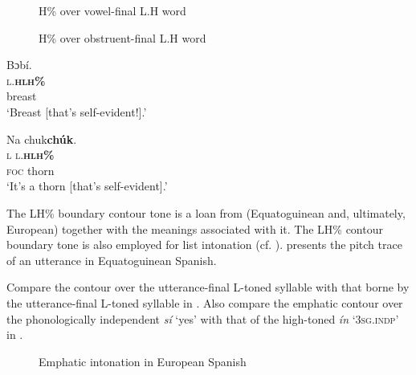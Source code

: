 \begin{figure}
\caption{H\% over vowel-final L.H word}
\label{fig:key:3.33}
\end{figure}


\begin{figure}
\caption{H\% over obstruent-final L.H word}
\label{fig:key:3.34}
\end{figure}

\clearpage 
\ea%
    \label{ex:key:86}
    \glll   Bɔbí.\\
\textsc{l.}\textbf{\textsc{h}}\textbf{\textsc{lh\%}}\\
breast\\
\glt ‘Breast [that’s self-evident!].’ 
\z

\ea
\label{ex:key:87}
\glll Na  chuk\textbf{chúk}.\\
\textsc{l}  \textsc{l.}\textbf{\textsc{hlh\%}}\\
\textsc{foc}  thorn\\
\glt ‘It’s a thorn [that’s self-evident].’
\z

The LH\% boundary contour tone is a loan from (Equatoguinean and, ultimately, European)  together with the meanings associated with it. The LH\% contour boundary tone is also employed for list intonation (cf. ).  presents the pitch trace of an utterance in Equatoguinean Spanish.


Compare the contour over the utterance-final L-toned syllable with that borne by the utterance-final L-toned syllable in . Also compare the emphatic contour over the phonologically independent \textit{sí} ‘yes’ with that of the high-toned \textit{ín} ‘\textsc{3sg.indp}’ in .


\begin{figure}
\caption{Emphatic intonation in European Spanish}
\label{fig:key:3.35}
\end{figure}
 


